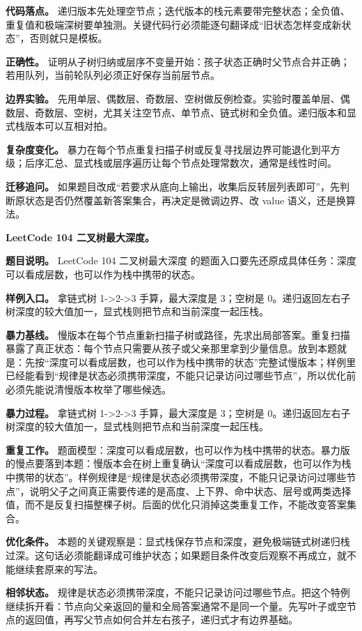 \textbf{代码落点。} 递归版本先处理空节点；迭代版本的栈元素要带完整状态；全负值、重复值和极端深树要单独测。关键代码行必须能逐句翻译成“旧状态怎样变成新状态”，否则就只是模板。

\textbf{正确性。} 证明从子树归纳或层序不变量开始：孩子状态正确时父节点合并正确；若用队列，当前轮队列必须正好保存当前层节点。

\textbf{边界实验。} 先用单层、偶数层、奇数层、空树做反例检查。实验时覆盖单层、偶数层、奇数层、空树，尤其关注空节点、单节点、链式树和全负值。递归版本和显式栈版本可以互相对拍。

\textbf{复杂度变化。} 暴力在每个节点重复扫描子树或反复寻找层边界可能退化到平方级；后序汇总、显式栈或层序遍历让每个节点处理常数次，通常是线性时间。

\textbf{迁移追问。} 如果题目改成“若要求从底向上输出，收集后反转层列表即可”，先判断原状态是否仍然覆盖新答案集合，再决定是微调边界、改 value 语义，还是换算法。

\noindent\textbf{LeetCode 104 二叉树最大深度。}

\textbf{题目说明。} LeetCode 104 二叉树最大深度 的题面入口要先还原成具体任务：深度可以看成层数，也可以作为栈中携带的状态。

\textbf{样例入口。} 拿链式树 1->2->3 手算，最大深度是 3；空树是 0。递归返回左右子树深度的较大值加一，显式栈则把节点和当前深度一起压栈。

\textbf{暴力基线。} 慢版本在每个节点重新扫描子树或路径，先求出局部答案。重复扫描暴露了真正状态：每个节点只需要从孩子或父亲那里拿到少量信息。放到本题就是：先按“深度可以看成层数，也可以作为栈中携带的状态”完整试慢版本；样例里已经能看到“规律是状态必须携带深度，不能只记录访问过哪些节点”，所以优化前必须先能说清慢版本枚举了哪些候选。

\textbf{暴力过程。} 拿链式树 1->2->3 手算，最大深度是 3；空树是 0。递归返回左右子树深度的较大值加一，显式栈则把节点和当前深度一起压栈。

\textbf{重复工作。} 题面模型：深度可以看成层数，也可以作为栈中携带的状态。暴力版的慢点要落到本题：慢版本会在树上重复确认“深度可以看成层数，也可以作为栈中携带的状态”。样例规律是“规律是状态必须携带深度，不能只记录访问过哪些节点”，说明父子之间真正需要传递的是高度、上下界、命中状态、层号或两类选择值，而不是反复扫描整棵子树。后面的优化只消掉这类重复工作，不能改变答案集合。

\textbf{优化条件。} 本题的关键观察是：显式栈保存节点和深度，避免极端链式树递归栈过深。这句话必须能翻译成可维护状态；如果题目条件改变后观察不再成立，就不能继续套原来的写法。

\textbf{相邻状态。} 规律是状态必须携带深度，不能只记录访问过哪些节点。把这个特例继续拆开看：节点向父亲返回的量和全局答案通常不是同一个量。先写叶子或空节点的返回值，再写父节点如何合并左右孩子，递归式才有边界基础。

